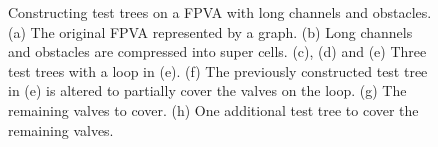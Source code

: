 \begin{figure}[t]\caption{Constructing test trees on a  FPVA with long channels and obstacles. (a) The original FPVA represented by a graph. (b) Long channels and obstacles are compressed into super cells. (c), (d) and (e) Three test trees with a loop in (e).  (f) The previously constructed test tree in (e) is altered to partially cover the valves on the loop. (g) The remaining valves to cover. (h) One additional test tree to cover the remaining valves.}\end{figure}


